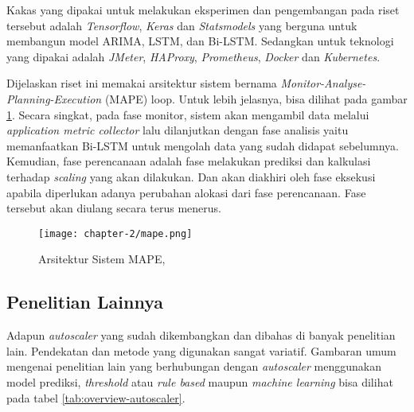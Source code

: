 Kakas yang dipakai untuk melakukan eksperimen dan pengembangan pada riset tersebut adalah \textit{Tensorflow}, \textit{Keras} dan \textit{Statsmodels} yang berguna untuk membangun model ARIMA, LSTM, dan Bi-LSTM. Sedangkan untuk teknologi yang dipakai adalah \textit{JMeter}, \textit{HAProxy}, \textit{Prometheus}, \textit{Docker} dan \textit{Kubernetes}.

Dijelaskan riset ini memakai arsitektur sistem bernama \textit{Monitor-Analyse-Planning-Execution} (MAPE) loop. Untuk lebih jelasnya, bisa dilihat pada gambar \ref{fig:mape}. Secara singkat, pada fase monitor, sistem akan mengambil data melalui \textit{application metric collector} lalu dilanjutkan dengan fase analisis yaitu memanfaatkan Bi-LSTM untuk mengolah data yang sudah didapat sebelumnya. Kemudian, fase perencanaan adalah fase melakukan prediksi dan kalkulasi terhadap \textit{scaling} yang akan dilakukan. Dan akan diakhiri oleh fase eksekusi apabila diperlukan adanya perubahan alokasi dari fase perencanaan. Fase tersebut akan diulang secara terus menerus.

\begin{figure}[h]
    \centering
    \texttt{[image: chapter-2/mape.png]}
    \caption{Arsitektur Sistem MAPE, \parencite{riset1}}
    \label{fig:mape}
\end{figure}

\subsection{Penelitian Lainnya}

Adapun \textit{autoscaler} yang sudah dikembangkan dan dibahas di banyak penelitian lain. Pendekatan dan metode yang digunakan sangat variatif. Gambaran umum mengenai penelitian lain yang berhubungan dengan \textit{autoscaler} menggunakan model prediksi, \textit{threshold} atau \textit{rule based} maupun \textit{machine learning} bisa dilihat pada tabel \ref{tab:overview-autoscaler}.

